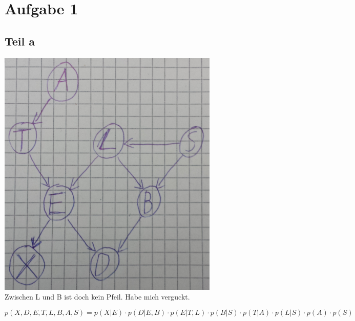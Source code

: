 \documentclass[10pt,a4paper]{article}
\begin{document}
\section{Aufgabe 1}

\subsection{Teil a}

\includegraphics[width=300pt]{2_1_a.png}
\\
Zwischen L und B ist doch kein Pfeil. Habe mich verguckt.

\begin{equation}
  p(X, D, E, T, L, B, A, S) = p(X | E) \cdot p(D | E, B) \cdot p(E | T, L) \cdot p(B | S) \cdot p(T | A) \cdot p(L | S) \cdot p(A) \cdot p(S)
\end{equation}
\end{document}
